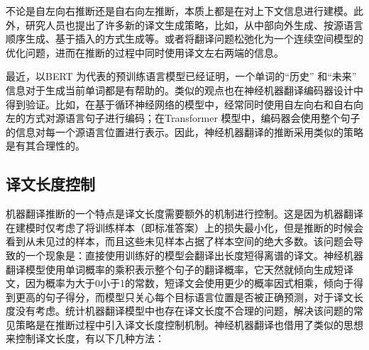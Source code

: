 \parinterval 不论是自左向右推断还是自右向左推断，本质上都是在对上下文信息进行建模。此外，研究人员也提出了许多新的译文生成策略，比如，从中部向外生成、按源语言顺序生成、基于插入的方式生成等。或者将翻译问题松弛化为一个连续空间模型的优化问题，进而在推断的过程中同时使用译文左右两端的信息。

\parinterval 最近，以BERT 为代表的预训练语言模型已经证明，一个单词的“历史” 和“未来” 信息对于生成当前单词都是有帮助的。类似的观点也在神经机器翻译编码器设计中得到验证。比如，在基于循环神经网络的模型中，经常同时使用自左向右和自右向左的方式对源语言句子进行编码；在Transformer 模型中，编码器会使用整个句子的信息对每一个源语言位置进行表示。因此，神经机器翻译的推断采用类似的策略是有其合理性的。


\subsection{译文长度控制}

\parinterval 机器翻译推断的一个特点是译文长度需要额外的机制进行控制。这是因为机器翻译在建模时仅考虑了将训练样本（即标准答案）上的损失最小化，但是推断的时候会看到从未见过的样本，而且这些未见样本占据了样本空间的绝大多数。该问题会导致的一个现象是：直接使用训练好的模型会翻译出长度短得离谱的译文。神经机器翻译模型使用单词概率的乘积表示整个句子的翻译概率，它天然就倾向生成短译文，因为概率为大于0小于1的常数，短译文会使用更少的概率因式相乘，倾向于得到更高的句子得分，而模型只关心每个目标语言位置是否被正确预测，对于译文长度没有考虑。统计机器翻译模型中也存在译文长度不合理的问题，解决该问题的常见策略是在推断过程中引入译文长度控制机制。神经机器翻译也借用了类似的思想来控制译文长度，有以下几种方法：

